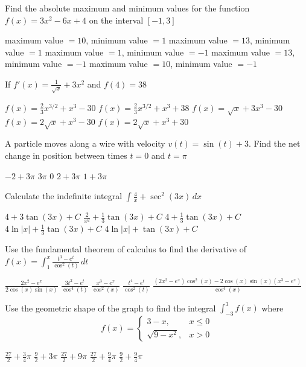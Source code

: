 \documentclass[11pt]{article}
\begin{document}
\begin{questions}
\begin{multiplechoice}{5}

\question Find the absolute maximum and minimum values for the function 
$f(x) = 3x^2 - 6x + 4$ on the interval $[-1, 3]$
\begin{answers}{1}
\ans maximum value $= 10$, minimum value $ = 1$
\ans maximum value $= 13$, minimum value $ = 1$
\ans maximum value $= 1$, minimum value $ = -1$
\ans maximum value $= 13$, minimum value $ = -1$
\ans maximum value $= 10$, minimum value $ = -1$
\end{answers}


\question If $f'(x) = \frac{1}{\sqrt{x}} + 3x^2$ and $f(4) = 38$
\begin{answers}{2}
\ans $f(x) = \frac{2}{3} x^{3/2} + x^3 - 30$ 
\ans $f(x) = \frac{2}{3} x^{3/2} + x^3 + 38$
\ans $f(x) = \sqrt{x} + 3x^3 -30$
\ans $f(x) = 2\sqrt{x} + x^3 - 30$
\ans $f(x) = 2\sqrt{x} + x^3 + 30$
\end{answers}


\question A particle moves along a wire with velocity $v(t) = \sin(t) + 3$.  Find the
net change in position between times $t = 0$ and $t = \pi$
\begin{answers}{2}
\ans $-2 + 3\pi$
\ans $3\pi$
\ans $0$
\ans $2 + 3\pi$
\ans $1  + 3\pi$
\end{answers}

\question Calculate the indefinite integral 
$\displaystyle \int \frac{4}{x} + \sec^2(3x) \, dx$
\begin{answers}{2}
\ans $4 + 3 \tan(3x) + C$
\ans $\frac{2}{x^2} + \frac{1}{3}\tan(3x) + C$
\ans $4  + \frac{1}{3}\tan(3x) + C$
\ans $4 \ln |x| + \frac{1}{3}\tan(3x) + C$
\ans $4 \ln|x|  + \tan(3x) + C$
\end{answers}


\newpage

\question Use the fundamental theorem of calculus to find the derivative of 
$\displaystyle f(x) = \int_1^x \frac{t^3 - e^t}{\cos^2(t)} \, dt$
\begin{answers}{2}
\ans $\frac{2x^2 - e^x}{2 \cos(x) \sin(x)}$
\ans $\frac{3 t^2 - e^t}{\cos^4(t)}$
\ans $\frac{x^3 - e^x}{\cos^2(x)}$
\ans $\frac{t^4 - e^t}{\cos^2(t)}$
\ans $\frac{(2x^2 - e^x)\cos^2(x) - 2 \cos(x) \sin(x) (x^3 - e^x)}{\cos^4(x)}$
\end{answers}

\question Use the geometric shape of the graph to find the integral 
$\displaystyle \int_{-3}^3 f(x)$ where 
$$ f(x) = 
\begin{cases}
3 - x, & x \le 0 \\
\sqrt{9 - x^2}, & x > 0
\end{cases}
$$
\begin{answers}{2}
\ans $\frac{27}{2} + \frac{3}{4}\pi$
\ans $\frac{9}{2} + 3\pi$
\ans $\frac{27}{2} + 9\pi$
\ans $\frac{27}{2} + \frac{9}{4}\pi$
\ans $\frac{9}{2} + \frac{9}{4}\pi$
\end{answers}


\end{multiplechoice}
\end{questions}
\end{document}
